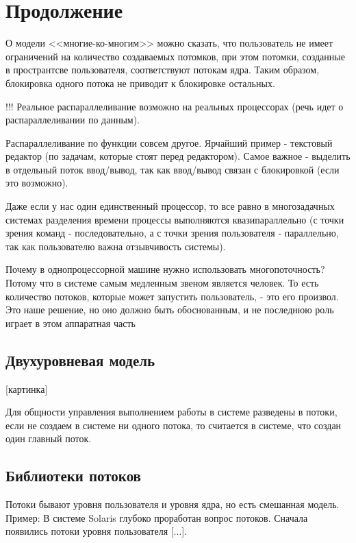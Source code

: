 \documentclass[14pt, a4paper]{article}
\begin{document}
	\section*{Продолжение}
	
	О модели <<многие-ко-многим>> можно сказать, что пользователь не имеет ограничений на количество создаваемых потомков, при этом потомки, созданные в пространтсве пользователя, соответствуют потокам ядра. Таким образом, блокировка одного потока не приводит к блокировке остальных.
	
	!!! Реальное распараллеливание возможно на реальных процессорах (речь идет о распараллеливании по данным).
	
	Распараллеливание по функции совсем другое. Ярчайший пример - текстовый редактор (по задачам, которые стоят перед редактором). Самое важное - выделить в отдельный поток ввод/вывод, так как ввод/вывод связан с блокировкой (если это возможно).
	
	Даже если у нас один единственный процессор, то все равно в многозадачных системах разделения времени процессы выполняются квазипараллельно (с точки зрения команд - последовательно, а с точки зрения пользователя - параллельно, так как пользователю важна отзывчивость системы).
	
	Почему в однопроцессорной машине нужно использовать многопоточность? Потому что в системе самым медленным звеном является человек. То есть количество потоков, которые может запустить пользователь, - это его произвол. Это наше решение, но оно должно быть обоснованным, и не последнюю роль играет в этом аппаратная часть
	
	\subsection*{Двухуровневая модель}
	
	[картинка]
	
	Для общности управления выполнением работы в системе разведены в потоки, если не создаем в системе ни одного потока, то считается в системе, что создан один главный поток.
	
	\subsection*{Библиотеки потоков}
	
	Потоки бывают уровня пользователя и уровня ядра, но есть смешанная модель. Пример: В системе Solaris глубоко проработан вопрос потоков. Сначала появились потоки уровня пользователя [...].
	
\end{document}
